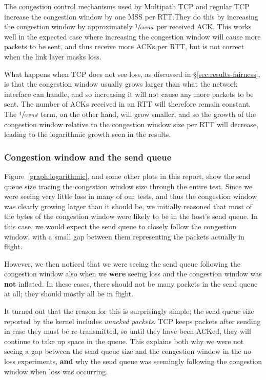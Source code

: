 The congestion control mechanisms used by Multipath TCP and regular TCP
increase the congestion window by one MSS per RTT.\@ They do this by increasing
the congestion window by approximately $\sfrac{1}{cwnd}$ per received ACK.\@
This works well in the expected case where increasing the congestion window will
cause more packets to be sent, and thus receive more ACKs per RTT, but is not
correct when the link layer masks loss.

What happens when TCP does not see loss, as discussed in \S\ref{sec:results-fairness}, 
is that the congestion window usually grows larger than what the network 
interface can handle, and so increasing it will not cause any more packets to be 
sent. The number of ACKs received in an RTT will therefore remain constant. The 
$\sfrac{1}{cwnd}$ term, on the other hand, will grow smaller, and so the growth of the 
congestion window relative to the congestion window size per RTT will decrease, 
leading to the logarithmic growth seen in the results.

\subsubsection{Congestion window and the send queue}
\label{sec:closing:sendq}
Figure~\ref{graph:logarithmic}, and some other plots in this report, show the
send queue size tracing the congestion window size through the entire test.
Since we were seeing very little loss in many of our tests, and thus the
congestion window was clearly growing larger than it should be, we initially
reasoned that most of the bytes of the congestion window were likely to be in
the host's send queue. In this case, we would expect the send queue to closely
follow the congestion window, with a small gap between them representing the
packets actually in flight.

However, we then noticed that we were seeing the send queue following the
congestion window also when we \textbf{were} seeing loss and the congestion
window was \textbf{not} inflated. In these cases, there should not be many
packets in the send queue at all; they should mostly all be in flight.

It turned out that the reason for this is surprisingly simple; the send queue
size reported by the kernel includes \textit{unacked packets}. TCP keeps packets
after sending in case they must be re-transmitted, so until they have been
ACKed, they will continue to take up space in the queue. This explains both why
we were not seeing a gap between the send queue size and the congestion window
in the no-loss experiments, \textbf{and} why the send queue was seemingly
following the congestion window when loss was occurring.

